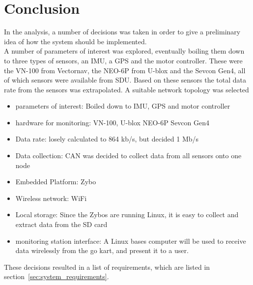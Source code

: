 





\section{Conclusion}
\label{sec:analysisconclusion}
In the analysis, a number of decisions was taken in order to give a preliminary idea of how the system should be implemented. \\

A number of parameters of interest was explored, eventually boiling them down to three types of sensors, an IMU, a GPS and the motor controller.
These were the VN-100 from Vectornav, the NEO-6P from U-blox and the Sevcon Gen4, all of which sensors were available from SDU.
Based on these sensors the total data rate from the sensors was extrapolated.
A suitable network topology was selected
\begin{itemize}
	\item parameters of interest: Boiled down to IMU, GPS and motor controller
	\item hardware for monitoring: VN-100, U-blox NEO-6P Sevcon Gen4
	\item Data rate: losely calculated to 864 kb/s, but decided 1 Mb/s
	\item Data collection: CAN was decided to collect data from all sensors onto one node
	\item Embedded Platform: Zybo
	\item Wireless network: WiFi
	\item Local storage: Since the Zybos are running Linux, it is easy to collect and extract data from the SD card 
	\item monitoring station interface: A Linux bases computer will be used to receive data wirelessly from the go kart, and present it to a user.  
\end{itemize}

These decisions resulted in a list of requirements, which are listed in section~\ref{sec:system_requirements}.

